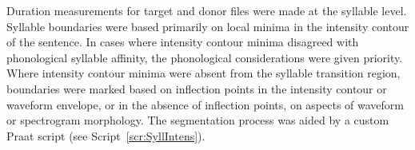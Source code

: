 
Duration measurements for target and donor files were made at the syllable level.  Syllable boundaries were based primarily on local minima in the intensity contour of the sentence.  In cases where intensity contour minima disagreed with phonological syllable affinity, the phonological considerations were given priority.\footnotemark{}  Where intensity contour minima were absent from the syllable transition region, boundaries were marked based on inflection points in the intensity contour or waveform envelope, or in the absence of inflection points, on aspects of waveform or spectrogram morphology.  The segmentation process was aided by a custom Praat script (see Script~\ref{scr:SyllIntens}).


